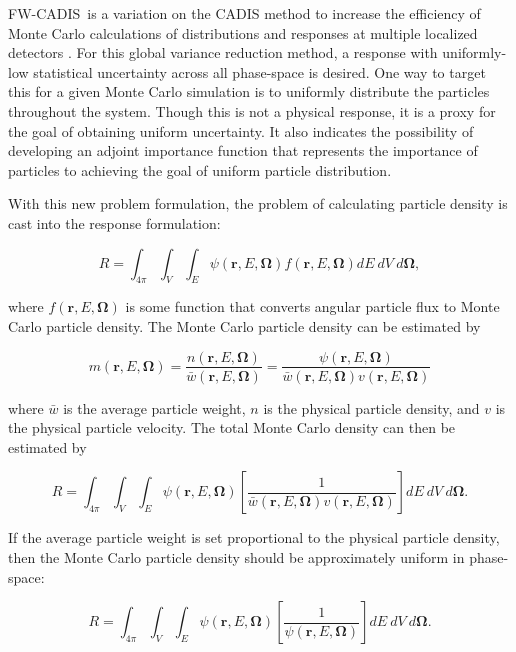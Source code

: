 \documentclass{article} %
\newcommand{\bo}{\mathbf\Omega}
\newcommand{\vecr}{\textbf{r}}
\newcommand{\fwc}{\mbox{FW-CADIS}}
\begin{document}
\fwc\ is a variation on the CADIS method to increase the efficiency of Monte
Carlo calculations of distributions and responses at multiple localized
detectors \cite{fwcadis}. For this global variance reduction method, a
response with uniformly-low statistical uncertainty across all phase-space is
desired. One way to target this for a given Monte Carlo simulation is to
uniformly distribute the particles throughout the system. Though this is not a
physical response, it is a proxy for the goal of obtaining uniform
uncertainty. It also indicates the possibility of developing an adjoint
importance function that represents the importance of particles to achieving
the goal of uniform particle distribution.

With this new problem formulation, the problem of calculating particle density
is cast into the response formulation:

\begin{equation}
R = \int_{4\pi}\int_{V}\int_{E}\psi(\vecr,E,\bo)f(\vecr,E,\bo)dE\ dV\ d\bo,
\end{equation}

\noindent where $f(\vecr,E,\bo)$ is some function that converts angular
particle flux to Monte Carlo particle density. The Monte Carlo particle 
density can be estimated by

\begin{equation}
m(\vecr,E,\bo) = \frac{n(\vecr,E,\bo)}{\bar{w}(\vecr,E,\bo)} 
= \frac{\psi(\vecr,E,\bo)}{\bar{w}(\vecr,E,\bo)v(\vecr,E,\bo)}
\end{equation}

\noindent where $\bar{w}$ is the average particle weight, $n$ is the physical
particle density, and $v$ is the physical particle velocity. The total Monte
Carlo density can then be estimated by

\begin{equation}
R = \int_{4\pi}\int_{V}\int_{E}\psi(\vecr,E,\bo)
\left[\frac{1}{\bar{w}(\vecr,E,\bo)v(\vecr,E,\bo)}\right]dE\ dV\ d\bo.
\label{eq:fwcadis_r}
\end{equation}

If the average particle weight is set proportional to the physical particle
density, then the Monte Carlo particle density should be approximately uniform
in phase-space:

\begin{equation}
R = \int_{4\pi}\int_{V}\int_{E}\psi(\vecr,E,\bo)
\left[\frac{1}{\psi(\vecr,E,\bo)}\right]dE\ dV\ d\bo.
\end{equation}
\end{document}
